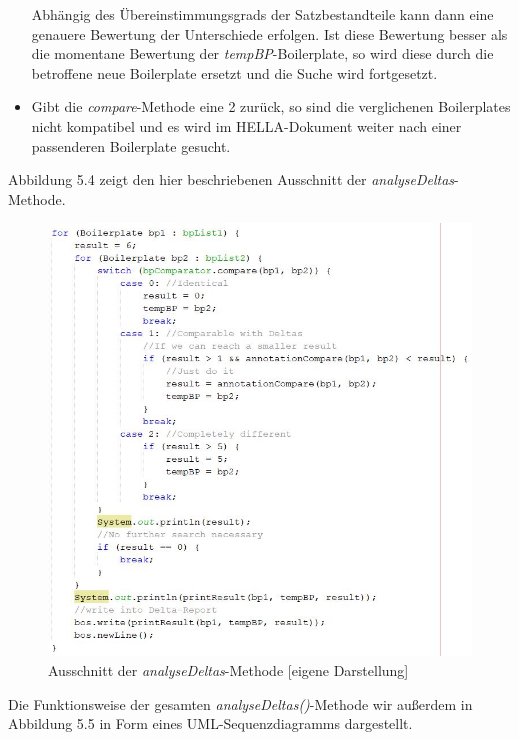 \documentclass[12pt]{report}
\begin{document}
\begin{itemize}
Abhängig des Übereinstimmungsgrads der Satzbestandteile kann dann eine genauere Bewertung der Unterschiede erfolgen. Ist diese Bewertung besser als die momentane Bewertung der \textit{tempBP}-Boilerplate, so wird diese durch die betroffene neue Boilerplate ersetzt und die Suche wird fortgesetzt.

\item Gibt die \textit{compare}-Methode eine 2 zurück, so sind die verglichenen Boilerplates nicht kompatibel und es wird im HELLA-Dokument weiter nach einer passenderen Boilerplate gesucht.

\end{itemize}

Abbildung 5.4 zeigt den hier beschriebenen Ausschnitt der \textit{analyseDeltas}-Methode.
\begin{figure}[H]
\begin{center}
\includegraphics[scale=0.7]{Bilder/analyseDeltas.jpg}
\caption{Ausschnitt der \textit{analyseDeltas}-Methode [eigene Darstellung]}
\end{center}
\end{figure}

Die Funktionsweise der gesamten \textit{analyseDeltas()}-Methode wir außerdem in Abbildung 5.5 in Form eines UML-Sequenzdiagramms dargestellt.
\end{document}
